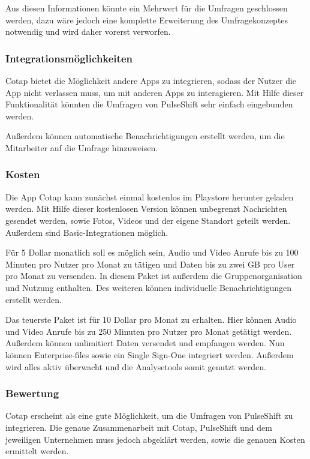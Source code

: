 Aus diesen Informationen könnte ein Mehrwert für die Umfragen geschlossen werden, dazu wäre jedoch eine komplette Erweiterung des Umfragekonzeptes notwendig und wird daher vorerst verworfen.

\subsubsection{Integrationsmöglichkeiten}
Cotap bietet die Möglichkeit andere Apps zu integrieren, sodass der Nutzer die App nicht verlassen muss, um mit anderen Apps zu interagieren. Mit Hilfe dieser Funktionalität könnten die Umfragen von PulseShift sehr einfach eingebunden werden. 

Außerdem können automatische Benachrichtigungen erstellt werden, um die Mitarbeiter auf die Umfrage hinzuweisen.

\subsubsection{Kosten}
Die App Cotap kann zunächst einmal kostenlos im Playstore herunter geladen werden. Mit Hilfe dieser kostenlosen Version können unbegrenzt Nachrichten gesendet werden, sowie Fotos, Videos und der eigene Standort geteilt werden. Außerdem sind Basic-Integrationen möglich. 

Für 5 Dollar monatlich soll es möglich sein, Audio und Video Anrufe bis zu 100 Minuten pro Nutzer pro Monat zu tätigen und Daten bis zu zwei GB pro User pro Monat zu versenden. In diesem Paket ist außerdem die Gruppenorganisation und Nutzung enthalten. Des weiteren können individuelle Benachrichtigungen erstellt werden.

Das teuerste Paket ist für 10 Dollar pro Monat zu erhalten. Hier können Audio und Video Anrufe bis zu 250 Minuten pro Nutzer pro Monat getätigt werden. Außerdem können unlimitiert Daten versendet und empfangen werden. Nun können Enterprise-files sowie ein Single Sign-One integriert werden. Außerdem wird alles aktiv überwacht und die Analysetools somit genutzt werden.

\subsubsection{Bewertung}
Cotap erscheint als eine gute Möglichkeit, um die Umfragen von PulseShift zu integrieren. Die genaue Zusammenarbeit mit Cotap, PulseShift und dem jeweiligen Unternehmen muss jedoch abgeklärt werden, sowie die genauen Kosten ermittelt werden.

